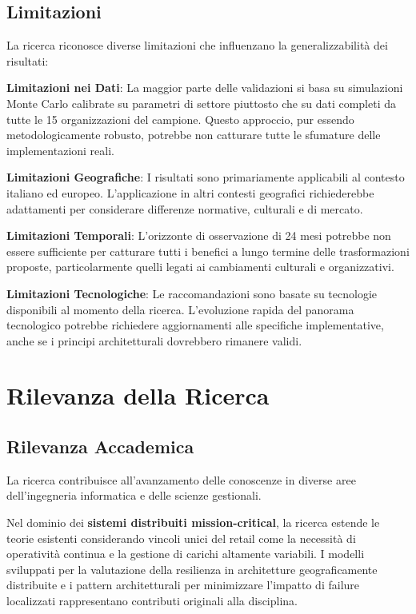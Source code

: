\subsection{Limitazioni}

La ricerca riconosce diverse limitazioni che influenzano la generalizzabilità dei risultati:

\textbf{Limitazioni nei Dati}: La maggior parte delle validazioni si basa su simulazioni Monte Carlo calibrate su parametri di settore piuttosto che su dati completi da tutte le 15 organizzazioni del campione. Questo approccio, pur essendo metodologicamente robusto, potrebbe non catturare tutte le sfumature delle implementazioni reali.

\textbf{Limitazioni Geografiche}: I risultati sono primariamente applicabili al contesto italiano ed europeo. L'applicazione in altri contesti geografici richiederebbe adattamenti per considerare differenze normative, culturali e di mercato.

\textbf{Limitazioni Temporali}: L'orizzonte di osservazione di 24 mesi potrebbe non essere sufficiente per catturare tutti i benefici a lungo termine delle trasformazioni proposte, particolarmente quelli legati ai cambiamenti culturali e organizzativi.

\textbf{Limitazioni Tecnologiche}: Le raccomandazioni sono basate su tecnologie disponibili al momento della ricerca. L'evoluzione rapida del panorama tecnologico potrebbe richiedere aggiornamenti alle specifiche implementative, anche se i principi architetturali dovrebbero rimanere validi.

\section{Rilevanza della Ricerca}

\subsection{Rilevanza Accademica}

La ricerca contribuisce all'avanzamento delle conoscenze in diverse aree dell'ingegneria informatica e delle scienze gestionali.

Nel dominio dei \textbf{sistemi distribuiti mission-critical}, la ricerca estende le teorie esistenti considerando vincoli unici del retail come la necessità di operatività continua e la gestione di carichi altamente variabili. I modelli sviluppati per la valutazione della resilienza in architetture geograficamente distribuite e i pattern architetturali per minimizzare l'impatto di failure localizzati rappresentano contributi originali alla disciplina.

